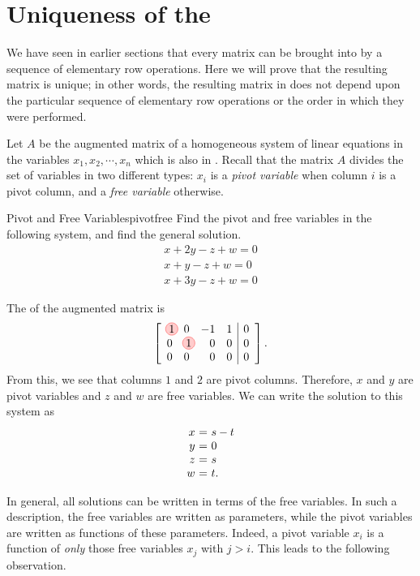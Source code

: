\section{Uniqueness of the {\RREF}}

We have seen in earlier sections that every matrix can be brought into
{\rref} by a sequence of elementary row operations. Here we will prove
that the resulting matrix is unique; in other words, the resulting
matrix in {\rref} does not depend upon the particular sequence of
elementary row operations or the order in which they were performed.

Let $A$ be the augmented matrix of a homogeneous system of linear
equations in the variables $x_1, x_2, \cdots, x_n$ which is also in
{\rref}. Recall that the matrix $A$ divides the set of variables in
two different types: $x_i$ is a
{\em pivot variable} when column $i$ is a pivot
column, and a {\em free variable} otherwise.

\begin{example}{Pivot and Free Variables}{pivotfree}
Find the pivot and free variables in the following system, and find
the general solution.
\[
\begin{array}{c}
x+2y-z+w=0 \\
x+y-z+w=0 \\
x+3y-z+w=0
\end{array}
\]
\end{example}

\begin{solution}
The {\rref} of the augmented matrix is
\[
\leftB
\begin{array}{rrrr|r}
\circled{1} & 0 & -1 & 1 & 0 \\
0 & \circled{1} & 0 & 0 & 0 \\
0 & 0 & 0 & 0 & 0
\end{array}
\rightB.
\]
From this, we see that columns $1$ and $2$ are pivot
columns. Therefore, $x$ and $y$ are pivot variables and $z$ and $w$
are free variables. We can write the solution to this system as
\[
\begin{array}{r@{~}c@{~}l}
x &=& s-t \\
y &=& 0 \\
z &=& s \\
w &=& t.
\end{array}
\]
\end{solution}

In general, all solutions can be written in terms of the free
variables. In such a description, the free variables are written as
parameters, while the pivot variables are written as functions of
these parameters. Indeed, a pivot variable $x_i$ is a function of {\em
  only} those free variables $x_j$ with $j>i$. This leads to the
following observation.

